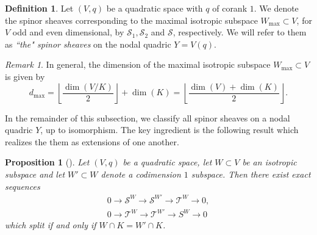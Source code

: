 \documentclass[a4paper, twoside, 11pt]{amsart}
\newtheorem{proposition}[theorem]{Proposition}
\theoremstyle{definition}
\newtheorem{definition}[theorem]{Definition}
\theoremstyle{remark}
\newtheorem{remark}[theorem]{Remark}
\numberwithin{equation}{theorem}
\newcommand{\wmax}{W_{\text{max}}}
\begin{document}
\begin{definition}\label{defi_spinors_sec3}
    Let $(V,q)$ be a quadratic space with $q$ of corank $1$. We denote the spinor sheaves corresponding to the maximal isotropic subspace $\wmax \subset V$, for $V$ odd and even dimensional, by $\mathcal{S}_1,\mathcal{S}_2$ and $\mathcal{S}$, respectively. We will refer to them as \textit{``the" spinor sheaves} on the nodal quadric $Y = V(q)$.
\end{definition}
\begin{remark}
    In general, the dimension of the maximal isotropic subspace $\wmax \subset V$ is given by $$d_{\mathrm{max}} = \left\lfloor\frac{\dim(V/K)}{2} \right\rfloor +\dim(K)= \left\lfloor\frac{\dim(V)+\dim(K)}{2}\right\rfloor.$$
\end{remark}
In the remainder of this subsection, we classify all spinor sheaves on a nodal quadric $Y$, up to isomorphism. The key ingredient is the following result which realizes the them as extensions of one another.
\begin{proposition}[{\cite[Proposition 3.3 and 3.4]{Addington}}]\label{extensions_spinors}
    Let $(V,q)$ be a quadratic space, let $W \subset V$ be an isotropic subspace and let $W' \subset W$ denote a codimension $1$ subspace. Then there exist exact sequences 
    \begin{equation}\label{possibly_interes_ext}
    \begin{aligned}
        0 \longrightarrow \mathcal{S}^W \longrightarrow \mathcal{S}^{W'} \longrightarrow \mathcal{T}^W \longrightarrow 0, \\
         0 \longrightarrow \mathcal{T}^W \longrightarrow \mathcal{T}^{W'} \longrightarrow S^W \longrightarrow 0
    \end{aligned}
    \end{equation}
    which split if and only if $W\cap K = W' \cap K$.
\end{proposition}
\end{document}
